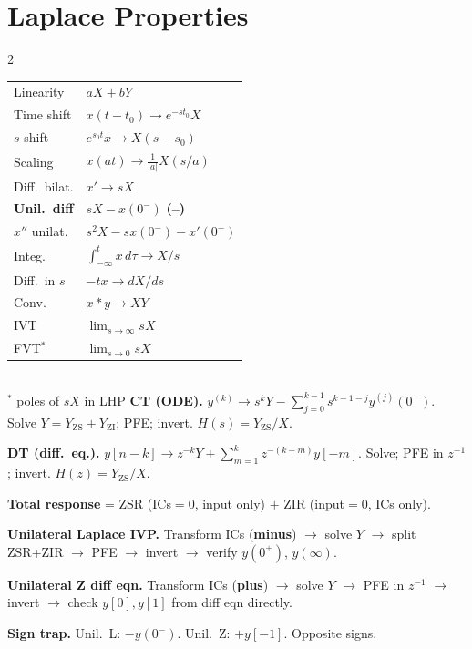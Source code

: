 \documentclass[11pt]{extarticle}
\newcommand{\pairsection}[4]{%
  \needspace{2.8in}%
  \columnratio{#1}%
  \section*{#2}%
  \begin{paracol}{2}%
  #3%
  \switchcolumn%
  #4%
  \end{paracol}%
  \par\vspace{4pt}}
\begin{document}
\pairsection{0.26}{Laplace Properties}{%
\begin{tabular}{@{}l l@{}}
\toprule
Linearity & $aX{+}bY$ \\
Time shift & $x(t{-}t_0)\!\to\!e^{-st_0}X$ \\
$s$-shift & $e^{s_0 t}x\!\to\!X(s{-}s_0)$ \\
Scaling & $x(at)\!\to\!\tfrac{1}{|a|}X(s/a)$ \\
Diff.\ bilat. & $x'\!\to\!sX$ \\
\textbf{Unil.\ diff} & $sX{-}x(0^-)$ \textbf{(--)} \\
$x''$ unilat. & $s^2X{-}sx(0^-){-}x'(0^-)$ \\
Integ. & $\int_{-\infty}^t\!x\,d\tau\!\to\!X/s$ \\
Diff.\ in $s$ & $-tx\!\to\!dX/ds$ \\
Conv. & $x*y\!\to\!XY$ \\
IVT & $\lim_{s\to\infty}\!sX$ \\
FVT$^\ast$ & $\lim_{s\to 0}\!sX$ \\
\bottomrule
\end{tabular}\\[1pt]
{\footnotesize$^\ast$ poles of $sX$ in LHP}%
}{%
\textbf{CT (ODE).} $y^{(k)}\!\to\! s^k Y - \sum_{j=0}^{k-1}\! s^{k-1-j} y^{(j)}(0^-)$. Solve $Y=Y_{\text{ZS}}+Y_{\text{ZI}}$; PFE; invert. $H(s)=Y_{\text{ZS}}/X$.

\textbf{DT (diff.\ eq.).} $y[n{-}k]\to z^{-k}Y + \sum_{m=1}^k z^{-(k-m)}y[-m]$. Solve; PFE in $z^{-1}$; invert. $H(z)=Y_{\text{ZS}}/X$.

\textbf{Total response} = ZSR (ICs$=0$, input only) $+$ ZIR (input$=0$, ICs only).

\textbf{Unilateral Laplace IVP.} Transform ICs (\textbf{minus}) $\to$ solve $Y$ $\to$ split ZSR+ZIR $\to$ PFE $\to$ invert $\to$ verify $y(0^+)$, $y(\infty)$.

\textbf{Unilateral Z diff eqn.} Transform ICs (\textbf{plus}) $\to$ solve $Y$ $\to$ PFE in $z^{-1}$ $\to$ invert $\to$ check $y[0], y[1]$ from diff eqn directly.

\textbf{Sign trap.} Unil.\ L: $\mathbf{-}y(0^-)$. Unil.\ Z: $\mathbf{+}y[-1]$. Opposite signs.%
}
\end{document}
